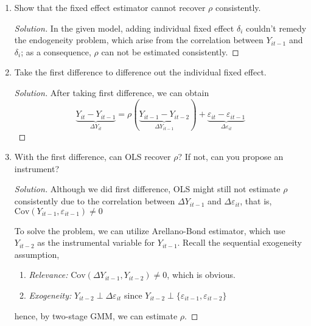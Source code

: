 \documentclass[11pt]{article}
\newenvironment{solution}{%
  \renewcommand\qedsymbol{$\blacksquare$}%
  \begin{mdframed}[backgroundcolor=gray!15]%
  \begin{proof}[Solution]}%
  {\end{proof}%
  \end{mdframed}}%
\newcommand{\cov}{\text{Cov}}
\begin{document}
    \begin{enumerate}

        \item Show that the fixed effect estimator cannot recover \( \rho \) consistently.
        
            \begin{solution}
                In the given model, adding individual fixed effect $\delta_i$ couldn't remedy the endogeneity problem, which arise from the correlation between $Y_{it-1}$ and $\delta_i$; as a consequence, $\rho$ can not be estimated consistently.
            \end{solution}
            
        
        \item Take the first difference to difference out the individual fixed effect.
        
            \begin{solution}
                After taking first difference, we can obtain
                \[
                    \underbrace{Y_{it} - Y_{it-1}}_{\Delta Y_{it}} = \rho(\underbrace{Y_{it-1} - Y_{it-2}}_{\Delta Y_{it-1}}) + \underbrace{\varepsilon_{it} - \varepsilon_{it-1}}_{\Delta \varepsilon_{it}}
                \]
            \end{solution}
        
        \item With the first difference, can OLS recover \( \rho \)? If not, can you propose an instrument?
            
            \begin{solution}
                Although we did first difference, OLS might still not estimate $\rho$ consistently due to the correlation between $\Delta Y_{it-1}$ and $\Delta \varepsilon_{it}$, that is, $\cov(Y_{it-1}, \varepsilon_{it-1}) \neq 0$

                To solve the problem, we can utilize Arellano-Bond estimator, which use $Y_{it-2}$ as the instrumental variable for $Y_{it-1}$. Recall the sequential exogeneity assumption, 
                \begin{enumerate}
                    \item {\it Relevance:} $\cov(\Delta Y_{it-1}, Y_{it-2}) \neq 0$, which is obvious.
                    \item {\it Exogeneity:} $Y_{it-2} \perp \Delta\varepsilon_{it}$ since $Y_{it-2} \perp \{\varepsilon_{it-1},\varepsilon_{it-2}\}$
                \end{enumerate}
                hence, by two-stage GMM, we can estimate $\rho$.
            \end{solution}

    \end{enumerate}
\end{document}
